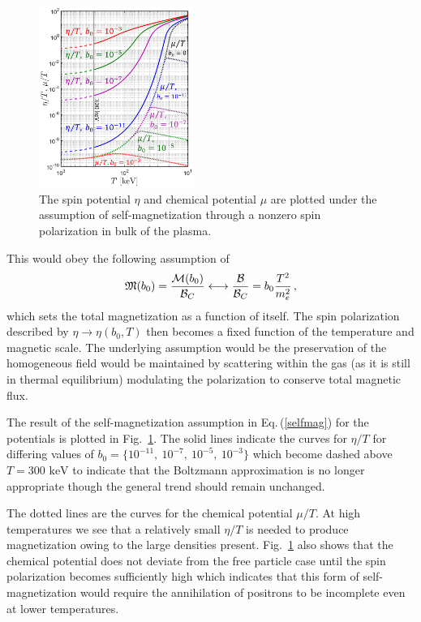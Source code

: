 \documentclass[aps,prd,floatfix,reprint]{revtex4-2}
\newcommand*{\keV}{\text{ keV}}
\newcommand{\req}[1]{Eq.\,(\ref{#1})}
\newcommand{\rf}[1]{Fig.~{\ref{#1}}}
\begin{document}
\begin{figure}[ht]
 \centering
 \includegraphics[width=0.45\textwidth]{plots/Spinchemical_03.png}
 \caption{The spin potential $\eta$ and chemical potential $\mu$ are plotted under the assumption of self-magnetization through a nonzero spin polarization in bulk of the plasma.}
 \label{fig:self} 
\end{figure}

This would obey the following assumption of
\begin{align}
 \label{selfmag}
 {\mathfrak M}(b_{0})=\frac{{\cal M}(b_0)}{{\cal B}_{C}}\longleftrightarrow\frac{\cal B}{{\cal B}_{C}}=b_{0}\frac{T^{2}}{m_{e}^{2}}\,,
\end{align}
which sets the total magnetization as a function of itself. The spin polarization described by $\eta\rightarrow\eta(b_{0},T)$ then becomes a fixed function of the temperature and magnetic scale. The underlying assumption would be the preservation of the homogeneous field would be maintained by scattering within the gas (as it is still in thermal equilibrium) modulating the polarization to conserve total magnetic flux.

The result of the self-magnetization assumption in \req{selfmag} for the potentials is plotted in \rf{fig:self}. The solid lines indicate the curves for $\eta/T$ for differing values of $b_{0}=\{10^{-11},\ 10^{-7},\ 10^{-5},\ 10^{-3}\}$ which become dashed above $T=300\keV$ to indicate that the Boltzmann approximation is no longer appropriate though the general trend should remain unchanged. 

The dotted lines are the curves for the chemical potential $\mu/T$. At high temperatures we see that a relatively small $\eta/T$ is needed to produce magnetization owing to the large densities present. \rf{fig:self} also shows that the chemical potential does not deviate from the free particle case until the spin polarization becomes sufficiently high which indicates that this form of self-magnetization would require the annihilation of positrons to be incomplete even at lower temperatures.
\end{document}
